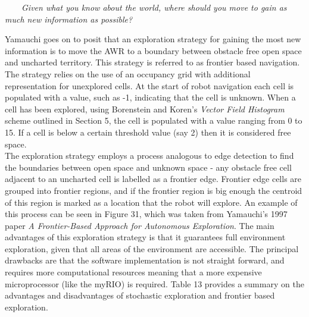 \documentclass[a4paper]{article}
\begin{document}
\vspace{0.5cm}

 \ \ \ \ \textit{Given what you know about the world, where should you move to gain as much new information as possible?}

\vspace{0.5cm}

Yamauchi goes on to posit that an exploration strategy for gaining the most new information is to move the AWR to a boundary between obstacle free open space and uncharted territory. This strategy is referred to as frontier based navigation. The strategy relies on the use of an occupancy grid with additional representation for unexplored cells. At the start of robot navigation each cell is populated with a value, such as -1, indicating that the cell is unknown. When a cell has been explored, using Borenstein and Koren's \textit{Vector Field Histogram} scheme outlined in Section 5, the cell is populated with a value ranging from 0 to 15. If a cell is below a certain threshold value (say 2) then it is considered free space.\\

The exploration strategy employs a process analogous to edge detection to find the boundaries between open space and unknown space - any obstacle free cell adjacent to an uncharted cell is labelled as a frontier edge. Frontier edge cells are grouped into frontier regions, and if the frontier region is big enough the centroid of this region is marked as a location that the robot will explore. An example of this process can be seen in Figure 31, which was taken from Yamauchi's 1997 paper \textit{A Frontier-Based Approach for Autonomous Exploration}. The main advantages of this exploration strategy is that it guarantees full environment exploration, given that all areas of the environment are accessible. The principal drawbacks are that the software implementation is not straight forward, and requires more computational resources meaning that a more expensive microprocessor (like the myRIO) is required. Table 13 provides a summary on the advantages and disadvantages of stochastic exploration and frontier based exploration.
\end{document}

